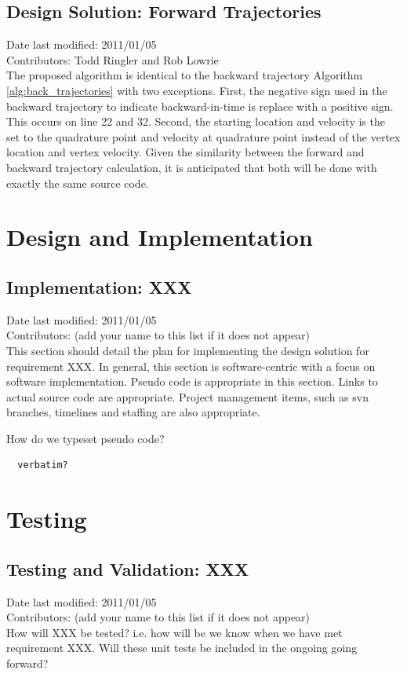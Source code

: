 \documentclass[11pt]{report}
\begin{document}
\section{Design Solution: Forward Trajectories}
Date last modified: 2011/01/05 \\
Contributors: Todd Ringler and Rob Lowrie \\
The proposed algorithm is identical to the backward trajectory Algorithm \ref{alg:back_trajectories} with two exceptions. First, the negative sign used in the backward trajectory to indicate backward-in-time is replace with a positive sign. This occurs on line 22 and 32. Second, the starting location and velocity is the set to the quadrature point and velocity at quadrature point instead of the vertex location and vertex velocity. Given the similarity between the forward and backward trajectory calculation, it is anticipated that both will be done with exactly the same source code.


\chapter{Design and Implementation}

\section{Implementation: XXX}
Date last modified: 2011/01/05 \\
Contributors: (add your name to this list if it does not appear) \\

This section should detail the plan for implementing the design solution for requirement XXX. In general, this section is software-centric with a focus on software implementation. Pseudo code is appropriate in this section. Links to actual source code are appropriate. Project management items, such as svn branches, timelines and staffing are also appropriate.

How do we typeset pseudo code? 
\begin{verbatim}
  verbatim?
\end{verbatim}


\chapter{Testing}

\section{Testing and Validation: XXX}
Date last modified: 2011/01/05 \\
Contributors: (add your name to this list if it does not appear) \\

How will XXX be tested? i.e. how will be we know when we have met requirement XXX. Will these unit tests be included in the ongoing going forward?


\end{document}
